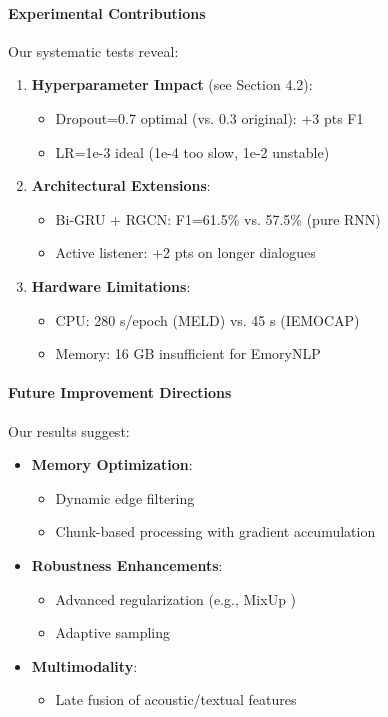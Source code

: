 \documentclass[a4paper,11pt]{article}
\begin{document}
\paragraph{Experimental Contributions}
Our systematic tests reveal:

\begin{enumerate}
  \item \textbf{Hyperparameter Impact} (see Section 4.2):
  \begin{itemize}
    \item Dropout=0.7 optimal (vs. 0.3 original): +3 pts F1
    \item LR=1e-3 ideal (1e-4 too slow, 1e-2 unstable)
  \end{itemize}

  \item \textbf{Architectural Extensions}:
  \begin{itemize}
    \item Bi-GRU + RGCN: F1=61.5\% vs. 57.5\% (pure RNN)
    \item Active listener: +2 pts on longer dialogues
  \end{itemize}

  \item \textbf{Hardware Limitations}:
  \begin{itemize}
    \item CPU: 280 s/epoch (MELD) vs. 45 s (IEMOCAP)
    \item Memory: 16 GB insufficient for EmoryNLP
  \end{itemize}
\end{enumerate}

\paragraph{Future Improvement Directions}
Our results suggest:

\begin{itemize}
  \item \textbf{Memory Optimization}:
  \begin{itemize}
    \item Dynamic edge filtering \cite{zhangetal2019memory}
    \item Chunk-based processing with gradient accumulation
  \end{itemize}

  \item \textbf{Robustness Enhancements}:
  \begin{itemize}
    \item Advanced regularization (e.g., MixUp \cite{zhang2018mixup})
    \item Adaptive sampling \cite{zhang-etal-2020-adapters}
  \end{itemize}

  \item \textbf{Multimodality}:
  \begin{itemize}
    \item Late fusion of acoustic/textual features \cite{poria2020misa}
  \end{itemize}
\end{itemize}
\end{document}
